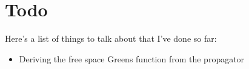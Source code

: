 \section*{Todo}

Here's a list of things to talk about that I've done so far:

\begin{itemize}
    \item Deriving the free space Greens function from the propagator
\end{itemize}
